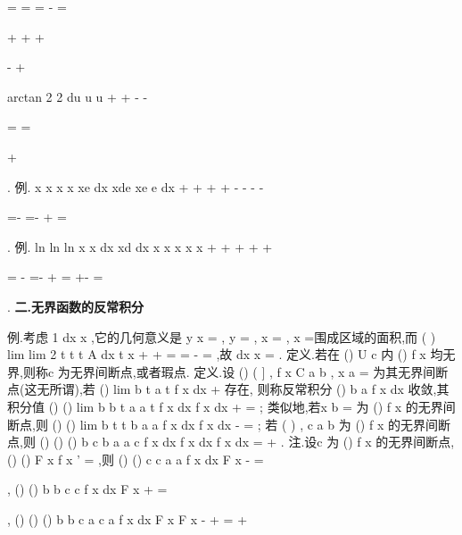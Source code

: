 =
=
=
-
=


+
+
+




-
+




\int 
\int 
\int 
{} arctan
2 2
du
u
u
\pi 
+\infty 
+\infty 
-\infty 
-\infty 


=
=


+


\int 
. 
\textcolor{lyred}{例}.
x
x
x
x
xe
dx
xde
xe
e
dx
+\infty 
+\infty 
+\infty 
+\infty 
-
-
-
-


=-
=-
+
=


\int 
\int 
\int 
. 
\textcolor{lyred}{例}.
ln
ln
ln
x
x
dx
xd
dx
x
x
x
x
x
+\infty 
+\infty 
+\infty 
+\infty 
+\infty 






=
-
=-
+
=
+-
=












\int 
\int 
\int 
. 
\vspace{4pt}
{\bfseries \textcolor{lyred}{二.无界函数的反常积分}}

\textcolor{lyred}{例}.考虑
1 dx
x
\int 
,它的几何意义是
y
x
=
,
y =
,
x =
,
x =围成区域的面积,而 
(
)
lim
lim 2
t
t
t
A
dx
t
x
+
+
\to 
\to 
=
=
-
=
\int 
,故
dx
x
=
\int 
. 
\textcolor{lyred}{定义}.若在
()
U c
\forall 
内
()
f x 均无界,则称c 为\textcolor{lyred}{无界间断点},或者\textcolor{lyred}{瑕点}. 
\textcolor{lyred}{定义}.设
()
(
]
,
f x
C a b
\in 
, x
a
=
为其无界间断点(这无所谓),若
()
lim
b
t
a
t
f x dx
+
\to \int 
存在, 
则称\textcolor{lyred}{反常积分}
()
b
a
f x dx
\int 
\textcolor{lyred}{收敛},其积分值
()
()
lim
b
b
t
a
a
t
f x dx
f x dx
+
\to 
=
\int 
\int 
; 
类似地,若x
b
=
为
()
f x 的无界间断点,则
()
()
lim
b
t
t
b
a
a
f x dx
f x dx
-
\to 
=
\int 
\int 
; 
若
(
)
,
c
a b
\in 
为
()
f x 的无界间断点,则
()
()
()
b
c
b
a
a
c
f x dx
f x dx
f x dx
=
+
\int 
\int 
\int 
. 
\textcolor{lyred}{注}.设c 为
()
f x 的无界间断点,
()
()
F
x
f x
'
=
,则
()
()
c
c
a
a
f x dx
F x
-
=



\int 
, 
()
()
b
b
c
c
f x dx
F x
+
=



\int 
,
()
()
()
b
b
c
a
c
a
f x dx
F x
F x
-
+
=
+








